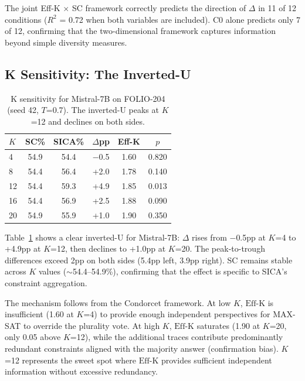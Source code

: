 \documentclass[11pt,a4paper]{article}
\newcommand{\effk}{\text{Eff-K}}
\begin{document}
The joint Eff-K $\times$ SC framework correctly predicts the direction of $\Delta$ in 11 of 12 conditions ($R^2$ = 0.72 when both variables are included). C0 alone predicts only 7 of 12, confirming that the two-dimensional framework captures information beyond simple diversity measures.

\subsection{K Sensitivity: The Inverted-U}

\begin{table}[t]
\centering
\small
\caption{K sensitivity for Mistral-7B on FOLIO-204 (seed 42, $T$=0.7). The inverted-U peaks at $K$=12 and declines on both sides.}
\label{tab:ksens_mistral}
\begin{tabular}{lccccc}
\toprule
\textbf{$K$} & \textbf{SC\%} & \textbf{SICA\%} & \textbf{$\Delta$pp} & \textbf{Eff-K} & \textbf{$p$} \\
\midrule
4 & 54.9 & 54.4 & $-$0.5 & 1.60 & 0.820 \\
8 & 54.4 & 56.4 & +2.0 & 1.78 & 0.140 \\
12 & 54.4 & 59.3 & +4.9 & 1.85 & 0.013 \\
16 & 54.4 & 56.9 & +2.5 & 1.88 & 0.090 \\
20 & 54.9 & 55.9 & +1.0 & 1.90 & 0.350 \\
\bottomrule
\end{tabular}
\end{table}

Table~\ref{tab:ksens_mistral} shows a clear inverted-U for Mistral-7B: $\Delta$ rises from $-$0.5pp at $K$=4 to +4.9pp at $K$=12, then declines to +1.0pp at $K$=20. The peak-to-trough differences exceed 2pp on both sides (5.4pp left, 3.9pp right). SC remains stable across $K$ values ($\sim$54.4--54.9\%), confirming that the effect is specific to SICA's constraint aggregation.

The mechanism follows from the Condorcet framework. At low $K$, $\effk$ is insufficient (1.60 at $K$=4) to provide enough independent perspectives for MAX-SAT to override the plurality vote. At high $K$, $\effk$ saturates (1.90 at $K$=20, only 0.05 above $K$=12), while the additional traces contribute predominantly redundant constraints aligned with the majority answer (confirmation bias). $K$=12 represents the sweet spot where $\effk$ provides sufficient independent information without excessive redundancy.
\end{document}
